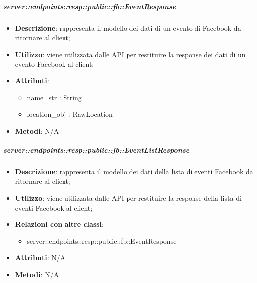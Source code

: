     \subparagraph{server::endpoints::resp::public::fb::EventResponse} %
    \label{subp:bdsm_app_server_endpoints_resp_public_fb_eventresponse}
    \begin{itemize}
      \item \textbf{Descrizione}: rappresenta il modello dei dati di un evento di Facebook da ritornare al client;
      \item \textbf{Utilizzo}: viene utilizzata dalle API per restituire la response dei dati di un evento Facebook al client;
      
	  \item \textbf{Attributi}:  
	  	\begin{itemize}
	  		\item name\_str : String
	  		\item location\_obj : RawLocation
	  	\end{itemize}
	  \item \textbf{Metodi}: N/A
      \end{itemize}

    \subparagraph{server::endpoints::resp::public::fb::EventListResponse} %
    \label{subp:bdsm_app_server_endpoints_resp_public_fb_eventlistresponse}
    \begin{itemize}
      \item \textbf{Descrizione}: rappresenta il modello dei dati della lista di eventi Facebook da ritornare al client;
      \item \textbf{Utilizzo}: viene utilizzata dalle API per restituire la response della lista di eventi Facebook al client;
      \item \textbf{Relazioni con altre classi}:
        \begin{itemize}
          \item server::endpoints::resp::public::fb::EventResponse
        \end{itemize}
	  \item \textbf{Attributi}: N/A
	  \item \textbf{Metodi}: N/A
      \end{itemize}

